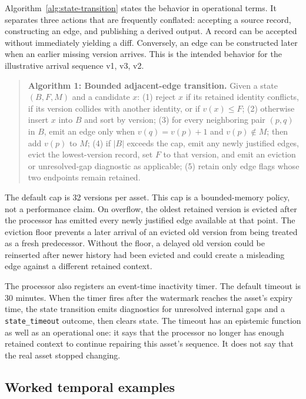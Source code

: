 \documentclass[a4paper,11pt]{article}
\begin{document}
Algorithm~\ref{alg:state-transition} states the behavior in operational terms. It separates three actions that are frequently conflated: accepting a source record, constructing an edge, and publishing a derived output. A record can be accepted without immediately yielding a diff. Conversely, an edge can be constructed later when an earlier missing version arrives. This is the intended behavior for the illustrative arrival sequence v1, v3, v2.

\begin{quote}
\textbf{Algorithm 1: Bounded adjacent-edge transition.} Given a state $(B,F,M)$ and a candidate $x$: (1) reject $x$ if its retained identity conflicts, if its version collides with another identity, or if $v(x)\leq F$; (2) otherwise insert $x$ into $B$ and sort by version; (3) for every neighboring pair $(p,q)$ in $B$, emit an edge only when $v(q)=v(p)+1$ and $v(p)\notin M$; then add $v(p)$ to $M$; (4) if $|B|$ exceeds the cap, emit any newly justified edges, evict the lowest-version record, set $F$ to that version, and emit an eviction or unresolved-gap diagnostic as applicable; (5) retain only edge flags whose two endpoints remain retained.\label{alg:state-transition}
\end{quote}

The default cap is 32 versions per asset. This cap is a bounded-memory policy, not a performance claim. On overflow, the oldest retained version is evicted after the processor has emitted every newly justified edge available at that point. The eviction floor prevents a later arrival of an evicted old version from being treated as a fresh predecessor. Without the floor, a delayed old version could be reinserted after newer history had been evicted and could create a misleading edge against a different retained context.

The processor also registers an event-time inactivity timer. The default timeout is 30 minutes. When the timer fires after the watermark reaches the asset's expiry time, the state transition emits diagnostics for unresolved internal gaps and a \texttt{state\_timeout} outcome, then clears state. The timeout has an epistemic function as well as an operational one: it says that the processor no longer has enough retained context to continue repairing this asset's sequence. It does not say that the real asset stopped changing.

\subsection{Worked temporal examples}
\end{document}
